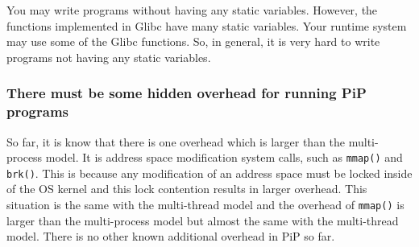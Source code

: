 You may write programs without having any static variables. However,
the functions implemented in Glibc have many static variables. Your
runtime system may use some of the Glibc functions. So, in general, it
is very hard to write programs not having any static variables.

\subsubsection*{There must be some hidden overhead for running PiP
  programs}

So far, it is know that there is one overhead which is larger than
the multi-process model. It is address space modification system
calls, such as {\tt mmap()} and {\tt brk()}. This is because any
modification of an address space must be locked inside of the OS
kernel and this lock contention results in larger overhead. This
situation is the same with the multi-thread model and the overhead of
{\tt mmap()} is larger than the multi-process model but almost the
same with the multi-thread model. There is no other known additional
overhead in PiP so far. 
